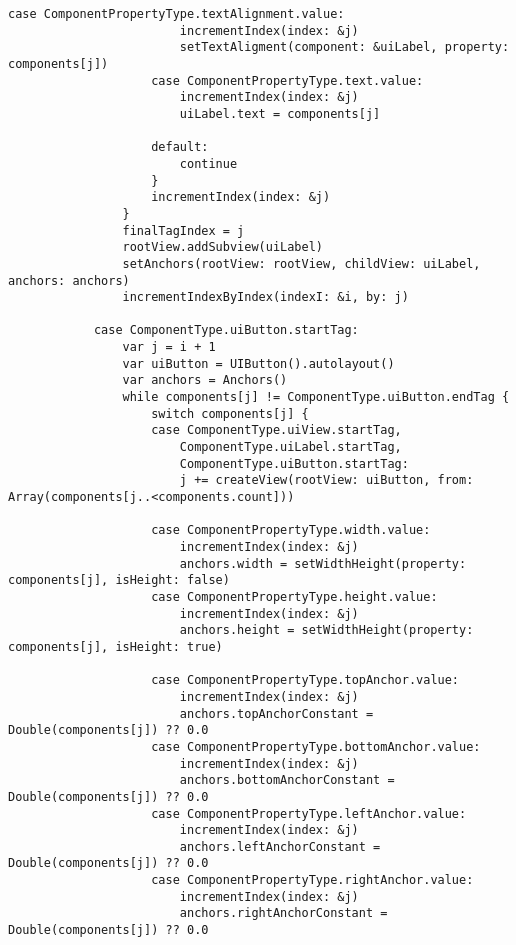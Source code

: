 \begin{lstlisting}[caption={Функция определения списка событий, по свершению которых происходит перезагрузка}]
                    case ComponentPropertyType.textAlignment.value:
                        incrementIndex(index: &j)
                        setTextAligment(component: &uiLabel, property: components[j])
                    case ComponentPropertyType.text.value:
                        incrementIndex(index: &j)
                        uiLabel.text = components[j]

                    default:
                        continue
                    }
                    incrementIndex(index: &j)
                }
                finalTagIndex = j
                rootView.addSubview(uiLabel)
                setAnchors(rootView: rootView, childView: uiLabel, anchors: anchors)
                incrementIndexByIndex(indexI: &i, by: j)

            case ComponentType.uiButton.startTag:
                var j = i + 1
                var uiButton = UIButton().autolayout()
                var anchors = Anchors()
                while components[j] != ComponentType.uiButton.endTag {
                    switch components[j] {
                    case ComponentType.uiView.startTag,
                        ComponentType.uiLabel.startTag,
                        ComponentType.uiButton.startTag:
                        j += createView(rootView: uiButton, from: Array(components[j..<components.count]))

                    case ComponentPropertyType.width.value:
                        incrementIndex(index: &j)
                        anchors.width = setWidthHeight(property: components[j], isHeight: false)
                    case ComponentPropertyType.height.value:
                        incrementIndex(index: &j)
                        anchors.height = setWidthHeight(property: components[j], isHeight: true)

                    case ComponentPropertyType.topAnchor.value:
                        incrementIndex(index: &j)
                        anchors.topAnchorConstant = Double(components[j]) ?? 0.0
                    case ComponentPropertyType.bottomAnchor.value:
                        incrementIndex(index: &j)
                        anchors.bottomAnchorConstant = Double(components[j]) ?? 0.0
                    case ComponentPropertyType.leftAnchor.value:
                        incrementIndex(index: &j)
                        anchors.leftAnchorConstant = Double(components[j]) ?? 0.0
                    case ComponentPropertyType.rightAnchor.value:
                        incrementIndex(index: &j)
                        anchors.rightAnchorConstant = Double(components[j]) ?? 0.0


\end{lstlisting}
